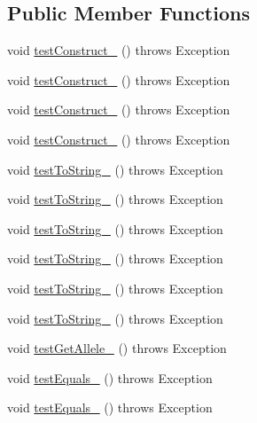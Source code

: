 \subsection*{Public Member Functions}
\begin{DoxyCompactItemize}
\item 
void \hyperlink{classorg_1_1jgap_1_1impl_1_1_map_gene_test_a6fd6049713214751800663597746ca15}{test\-Construct\-\_} ()  throws Exception 
\item 
void \hyperlink{classorg_1_1jgap_1_1impl_1_1_map_gene_test_a2259e972992fd4a2a8dacdd80263aaf7}{test\-Construct\-\_} ()  throws Exception 
\item 
void \hyperlink{classorg_1_1jgap_1_1impl_1_1_map_gene_test_a097eeab02b213dc76db3063c8e743697}{test\-Construct\-\_} ()  throws Exception 
\item 
void \hyperlink{classorg_1_1jgap_1_1impl_1_1_map_gene_test_a3bffc2642bca60f06a5e3f0c1cff60b9}{test\-Construct\-\_} ()  throws Exception 
\item 
void \hyperlink{classorg_1_1jgap_1_1impl_1_1_map_gene_test_a4dc696cec07451418218f1406c4ae333}{test\-To\-String\-\_} ()  throws Exception 
\item 
void \hyperlink{classorg_1_1jgap_1_1impl_1_1_map_gene_test_a353c565478e1693eba3d1422ed365b19}{test\-To\-String\-\_} ()  throws Exception 
\item 
void \hyperlink{classorg_1_1jgap_1_1impl_1_1_map_gene_test_a69dbbc7956d50b247d6cfae19a93f4ef}{test\-To\-String\-\_} ()  throws Exception 
\item 
void \hyperlink{classorg_1_1jgap_1_1impl_1_1_map_gene_test_a2c921a35595e6aaa94fa199e6e1d6c49}{test\-To\-String\-\_} ()  throws Exception 
\item 
void \hyperlink{classorg_1_1jgap_1_1impl_1_1_map_gene_test_a0affe0ce7427ea6b4926eb0ff1fd92b7}{test\-To\-String\-\_} ()  throws Exception 
\item 
void \hyperlink{classorg_1_1jgap_1_1impl_1_1_map_gene_test_a65be7596c2df1901886d5b698deafd03}{test\-To\-String\-\_} ()  throws Exception 
\item 
void \hyperlink{classorg_1_1jgap_1_1impl_1_1_map_gene_test_a7596ec075d333d0c1c65915fc2440cd6}{test\-Get\-Allele\-\_} ()  throws Exception 
\item 
void \hyperlink{classorg_1_1jgap_1_1impl_1_1_map_gene_test_a159a36bbd9db248348ea2bf45dbc2f08}{test\-Equals\-\_} ()  throws Exception 
\item 
void \hyperlink{classorg_1_1jgap_1_1impl_1_1_map_gene_test_adb2be3928f55387ff1b3330e7b4729d8}{test\-Equals\-\_} ()  throws Exception 

\end{DoxyCompactItemize}
